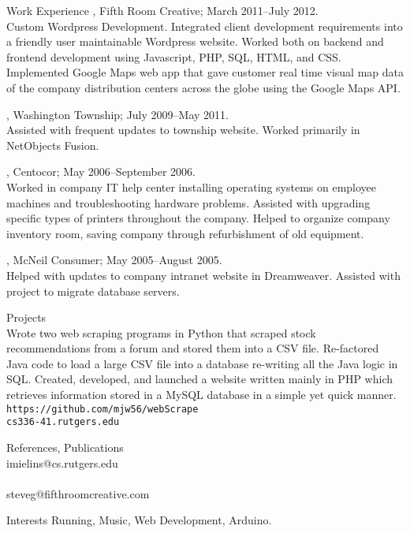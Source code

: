 \documentclass{resume}
\begin{document}
\begin{category}{Work Experience}
, Fifth Room Creative;
March 2011--July 2012.\\
Custom Wordpress Development. Integrated client development requirements into a friendly user maintainable Wordpress website. Worked both on backend and frontend development using Javascript, PHP, SQL, HTML, and CSS. Implemented Google Maps web app that gave customer real time visual map data of the company distribution centers across the globe using the Google Maps API.%

, Washington Township;
July 2009--May 2011.\\
Assisted with frequent updates to township website. Worked primarily in NetObjects Fusion. %

, Centocor;
May 2006--September 2006.\\
Worked in company IT help center installing operating systems on employee machines and troubleshooting hardware problems. Assisted with upgrading specific types of printers throughout the company. Helped to organize company inventory room, saving company through refurbishment of old equipment. %

, McNeil Consumer;
May 2005--August 2005.\\
Helped with updates to company intranet website in Dreamweaver. Assisted with project to migrate database servers.%
\end{category}

\begin{category}{Projects}
\\
Wrote two web scraping programs in Python that scraped stock recommendations from a forum and stored them into a CSV file. Re-factored Java code to load a large CSV file into a database re-writing all the Java logic in SQL. Created, developed, and launched a website written mainly in PHP which retrieves information stored in a MySQL database in a simple yet quick manner. \\
\mbox{\small\tt https://github.com/mjw56/webScrape}\\
\mbox{\small\tt cs336-41.rutgers.edu}
\end{category}



\begin{category}{References, Publications} 
\\
imielins@cs.rutgers.edu \\
\\
steveg@fifthroomcreative.com\\
\end{category}

\begin{category}{Interests}
\citemnobullet
Running, Music, Web Development, Arduino.
\end{category}
\end{document}
